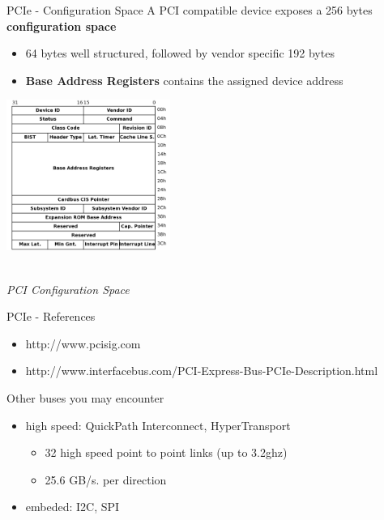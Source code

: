 \begin{frame}{PCIe - Configuration Space}
  A PCI compatible device exposes a 256 bytes \textbf{configuration space}
  \begin{itemize}
  \item 64 bytes well structured, followed by vendor specific 192 bytes
  \item \textbf{Base Address Registers} contains the assigned device address
  \end{itemize}

  \begin{center}
    \includegraphics[width=0.4\textwidth]{figures/pci_config_space.jpg}
    \smallskip
    \begin{tiny}
      \textit{\\PCI Configuration Space}
    \end{tiny}
  \end{center}

\end{frame}


\begin{frame}{PCIe - References}
  \begin{itemize}
  \item http://www.pcisig.com
  \item http://www.interfacebus.com/PCI-Express-Bus-PCIe-Description.html
  \end{itemize}
\end{frame}


\begin{frame}{Other buses you may encounter}
  \begin{itemize}
  \item high speed: QuickPath Interconnect, HyperTransport
    \begin{itemize}
    \item 32 high speed point to point links (up to 3.2ghz)
    \item 25.6 GB/s. per direction
    \end{itemize}
  \item embeded: I2C, SPI
  \end{itemize}
\end{frame}

